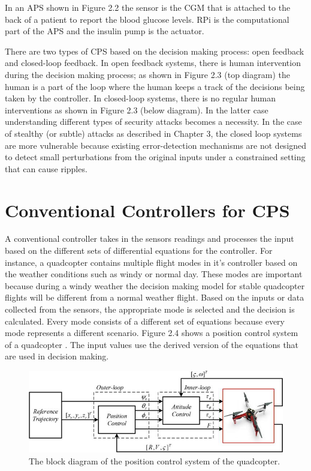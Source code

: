In an \ac{APS} shown in Figure 2.2 the sensor is the \ac{CGM} that is attached to the back of a patient to report the blood glucose levels.  
\ac{RPi} is the computational part of the \ac{APS} and the insulin pump is the actuator. 

There are two types of CPS based on the decision making process: open feedback and closed-loop feedback.
In open feedback systems, there is human intervention during the decision making process; as shown in Figure 2.3 (top diagram) the human is a part of the loop where the human keeps a track of the decisions being taken by the controller. 
In closed-loop systems, there is no regular human interventions as shown in Figure 2.3 (below diagram). 
In the latter case understanding different types of security attacks becomes a necessity. 
In the case of stealthy (or subtle) attacks as described in Chapter 3, the closed loop systems are more vulnerable because existing error-detection mechanisms are not designed to detect small perturbations from the original inputs under a constrained setting that can cause ripples. 

\section{Conventional Controllers for CPS}

A conventional controller takes in the sensors readings and processes the input based on the different sets of differential equations for the controller. 
For instance, a quadcopter contains multiple flight modes in it's controller based on the weather conditions such as windy or normal day. 
These modes are important because during a windy weather the decision making model for stable quadcopter flights will be different from a normal weather flight. 
Based on the inputs or data collected from the sensors, the appropriate  mode is selected and the decision is calculated. 
Every mode consists of a different set of equations because every mode represents a different scenario.
Figure 2.4 shows a position control system of a quadcopter \cite{inbook}. The input values use the derived version of the equations that are used in decision making. 

\begin{figure}
	\centering
	\includegraphics[width=0.7\linewidth]{Images/controltheory}
	\caption{The block diagram of the position control system of the quadcopter.
	}
	\label{fig:controltheory}
\end{figure}


